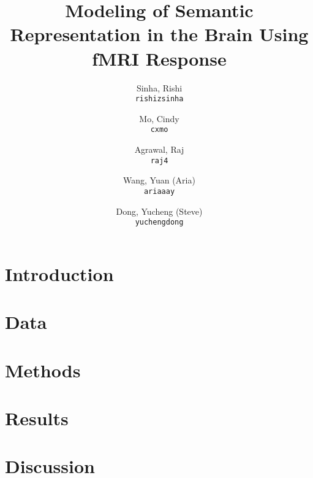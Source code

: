 \documentclass[12pt]{article}
\title{Modeling of Semantic Representation in the Brain Using fMRI Response}
\author{
  Sinha, Rishi\\
  \texttt{rishizsinha}
  \and
  Mo, Cindy\\
  \texttt{cxmo}
  \and
  Agrawal, Raj\\
  \texttt{raj4}
  \and
  Wang, Yuan (Aria)\\
  \texttt{ariaaay}
  \and
  Dong, Yucheng (Steve)\\
  \texttt{yuchengdong}
}
\begin{document}
\maketitle{}

\abstract{}


\section{Introduction}
        

\section{Data}
        

\section{Methods}
        

\section{Results}
		
        
\section{Discussion}
		



\end{document}
